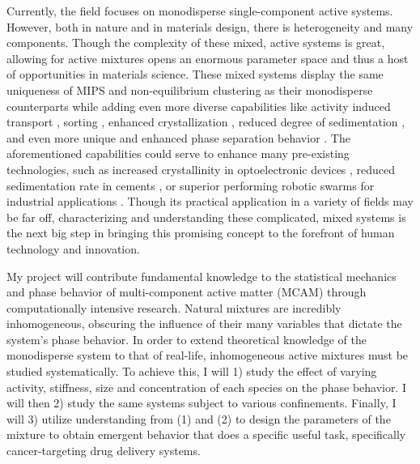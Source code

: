 \documentclass[11pt]{article}
\begin{document}
Currently, the field focuses on monodisperse single-component active systems. However, both in nature and in materials design, there is heterogeneity and many components. Though the complexity of these mixed, active systems is great, allowing for active mixtures opens an enormous parameter space and thus a host of opportunities in materials science.  These mixed systems display the same uniqueness of MIPS and non-equilibrium clustering as their monodisperse counterparts while adding even more diverse capabilities like activity induced transport \cite{Ghosh}, sorting \cite{Chen5}, enhanced crystallization \cite{Meer}, reduced degree of sedimentation \cite{Palacci4}, and even more unique and enhanced phase separation behavior \cite{Kolb}.  The aforementioned capabilities could serve to enhance many pre-existing technologies, such as increased crystallinity in optoelectronic devices \cite{Meer, Castro}, reduced sedimentation rate in cements \cite{Palacci4}, or superior performing robotic swarms for industrial applications \cite{Brambilla}.  Though its practical application in a variety of fields may be far off, characterizing and understanding these complicated, mixed systems is the next big step in bringing this promising concept to the forefront of human technology and innovation.

My project will contribute fundamental knowledge to the statistical mechanics and phase behavior of multi-component active matter (MCAM) through computationally intensive research. Natural mixtures are incredibly inhomogeneous, obscuring the influence of their many variables that dictate the system’s phase behavior.  In order to extend theoretical knowledge of the monodisperse system to that of real-life, inhomogeneous active mixtures must be studied systematically. To achieve this, I will 1) study the effect of varying activity, stiffness, size and concentration of each species on the phase behavior. I will then 2) study the same systems subject to various confinements. Finally, I will 3) utilize understanding from (1) and (2) to design the parameters of the mixture to obtain emergent behavior that does a specific useful task, specifically cancer-targeting drug delivery systems.
\end{document}

